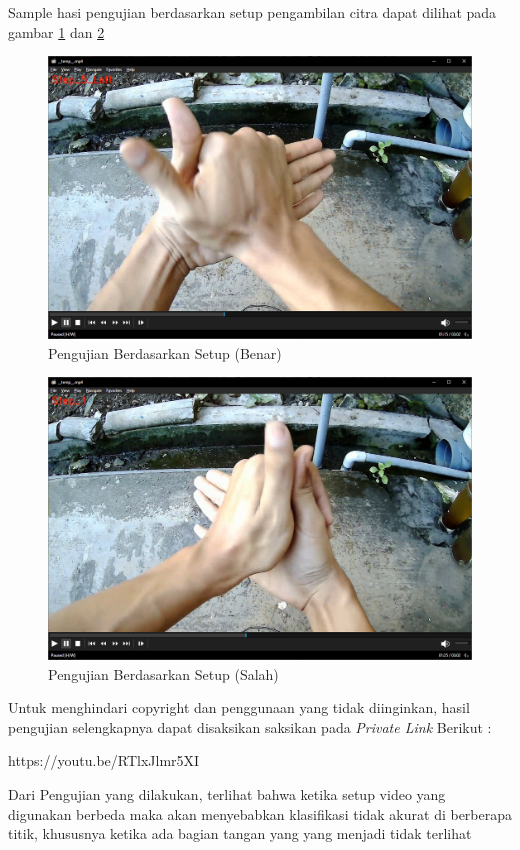 Sample hasi pengujian berdasarkan setup pengambilan citra dapat dilihat pada gambar \ref{fig:setupbenar1} dan \ref{fig:setupsalah1}

\begin{figure}[!ht]
	\centering
	\includegraphics[width=0.6\columnwidth]{gambar/setupbenar1.png}
	\caption{Pengujian Berdasarkan Setup (Benar)}
	\label{fig:setupbenar1}
\end{figure}
\begin{figure}[!ht]
	\centering
	\includegraphics[width=0.6\columnwidth]{gambar/setupsalah1.png}
	\caption{Pengujian Berdasarkan Setup (Salah)}
	\label{fig:setupsalah1}
\end{figure}

Untuk menghindari copyright dan penggunaan yang tidak diinginkan, hasil pengujian selengkapnya dapat disaksikan saksikan pada \textit{Private Link} Berikut :
\begin{center}
	https://youtu.be/RTlxJlmr5XI
\end{center}

Dari Pengujian yang dilakukan, terlihat bahwa ketika setup video yang digunakan berbeda maka akan menyebabkan klasifikasi tidak akurat di berberapa titik, khususnya ketika ada bagian tangan yang yang menjadi tidak terlihat
